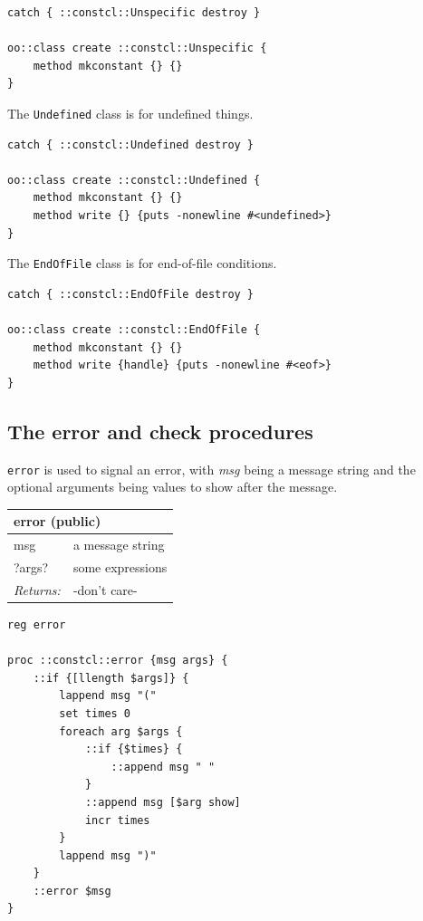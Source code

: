\documentclass[twoside,9pt]{report}
\begin{document}
\noindent\makebox[\linewidth]{\rule{\linewidth}{0.4pt}}
\begin{lstlisting}
catch { ::constcl::Unspecific destroy }
 
oo::class create ::constcl::Unspecific {
    method mkconstant {} {}
}
\end{lstlisting}
\noindent\makebox[\linewidth]{\rule{\linewidth}{0.4pt}}

The \texttt{Undefined} class is for undefined things.

\noindent\makebox[\linewidth]{\rule{\linewidth}{0.4pt}}
\begin{lstlisting}
catch { ::constcl::Undefined destroy }
 
oo::class create ::constcl::Undefined {
    method mkconstant {} {}
    method write {} {puts -nonewline #<undefined>}
}
\end{lstlisting}
\noindent\makebox[\linewidth]{\rule{\linewidth}{0.4pt}}

The \texttt{EndOfFile} class is for end-of-file conditions.

\noindent\makebox[\linewidth]{\rule{\linewidth}{0.4pt}}
\begin{lstlisting}
catch { ::constcl::EndOfFile destroy }
 
oo::class create ::constcl::EndOfFile {
    method mkconstant {} {}
    method write {handle} {puts -nonewline #<eof>}
}
\end{lstlisting}
\noindent\makebox[\linewidth]{\rule{\linewidth}{0.4pt}}
\subsection{The error and check procedures}
\label{the-error-and-check-procedures}

\texttt{error} is used to signal an error, with \emph{msg} being a message string and the optional arguments being values to show after the message.

\begin{tabular}{ |l l| }
\hline
\multicolumn{2}{|l|}{error (public)} \\
\hline
msg & a message string \\
?args? & some expressions \\
\textit{Returns:} & -don't care- \\
\hline
\end{tabular}

\noindent\makebox[\linewidth]{\rule{\linewidth}{0.4pt}}
\begin{lstlisting}
reg error
 
proc ::constcl::error {msg args} {
    ::if {[llength $args]} {
        lappend msg "("
        set times 0
        foreach arg $args {
            ::if {$times} {
                ::append msg " "
            }
            ::append msg [$arg show]
            incr times
        }
        lappend msg ")"
    }
    ::error $msg
}
\end{lstlisting}
\noindent\makebox[\linewidth]{\rule{\linewidth}{0.4pt}}
\end{document}
